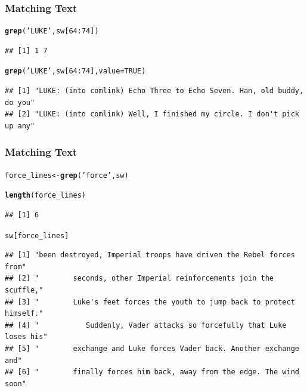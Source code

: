 \documentclass[12pt]{beamer}\usepackage[]{graphicx}\usepackage[]{color}
\makeatletter
\newcommand{\hlnum}[1]{\textcolor[rgb]{0.686,0.059,0.569}{#1}}%
\newcommand{\hlstr}[1]{\textcolor[rgb]{0.192,0.494,0.8}{#1}}%
\newcommand{\hlopt}[1]{\textcolor[rgb]{0,0,0}{#1}}%
\newcommand{\hlstd}[1]{\textcolor[rgb]{0.345,0.345,0.345}{#1}}%
\newcommand{\hlkwb}[1]{\textcolor[rgb]{0.69,0.353,0.396}{#1}}%
\newcommand{\hlkwc}[1]{\textcolor[rgb]{0.333,0.667,0.333}{#1}}%
\newcommand{\hlkwd}[1]{\textcolor[rgb]{0.737,0.353,0.396}{\textbf{#1}}}%
\newenvironment{kframe}{%
 \def\at@end@of@kframe{}%
 \ifinner\ifhmode%
  \def\at@end@of@kframe{\end{minipage}}%
  \begin{minipage}{\columnwidth}%
 \fi\fi%
 \def\FrameCommand##1{\hskip\@totalleftmargin \hskip-\fboxsep
 \colorbox{shadecolor}{##1}\hskip-\fboxsep
     \hskip-\linewidth \hskip-\@totalleftmargin \hskip\columnwidth}%
 \MakeFramed {\advance\hsize-\width
   \@totalleftmargin\z@ \linewidth\hsize
   \@setminipage}}%
 {\par\unskip\endMakeFramed%
 \at@end@of@kframe}
\newenvironment{knitrout}{}{} %
\makeatother
\begin{document}

\begin{frame}[fragile]
\frametitle{Matching Text}

\begin{knitrout}\scriptsize
{}\color{fgcolor}\begin{kframe}
\begin{alltt}
\hlkwd{grep}\hlstd{(}\hlstr{'LUKE'}\hlstd{, sw[}\hlnum{64}\hlopt{:}\hlnum{74}\hlstd{])}
\end{alltt}
\begin{verbatim}
## [1] 1 7
\end{verbatim}
\begin{alltt}
\hlkwd{grep}\hlstd{(}\hlstr{'LUKE'}\hlstd{, sw[}\hlnum{64}\hlopt{:}\hlnum{74}\hlstd{],} \hlkwc{value} \hlstd{=} \hlnum{TRUE}\hlstd{)}
\end{alltt}
\begin{verbatim}
## [1] "LUKE: (into comlink) Echo Three to Echo Seven. Han, old buddy, do you"
## [2] "LUKE: (into comlink) Well, I finished my circle. I don't pick up any"
\end{verbatim}
\end{kframe}
\end{knitrout}

\end{frame}


\begin{frame}[fragile]
\frametitle{Matching Text}

\begin{knitrout}\tiny
{}\color{fgcolor}\begin{kframe}
\begin{alltt}
\hlstd{force_lines} \hlkwb{<-} \hlkwd{grep}\hlstd{(}\hlstr{'force'}\hlstd{, sw)}

\hlkwd{length}\hlstd{(force_lines)}
\end{alltt}
\begin{verbatim}
## [1] 6
\end{verbatim}
\begin{alltt}
\hlstd{sw[force_lines]}
\end{alltt}
\begin{verbatim}
## [1] "been destroyed, Imperial troops have driven the Rebel forces from"    
## [2] "        seconds, other Imperial reinforcements join the scuffle,"     
## [3] "        Luke's feet forces the youth to jump back to protect himself."
## [4] "           Suddenly, Vader attacks so forcefully that Luke loses his" 
## [5] "        exchange and Luke forces Vader back. Another exchange and"    
## [6] "        finally forces him back, away from the edge. The wind soon"
\end{verbatim}
\end{kframe}
\end{knitrout}

\end{frame}
\end{document}
